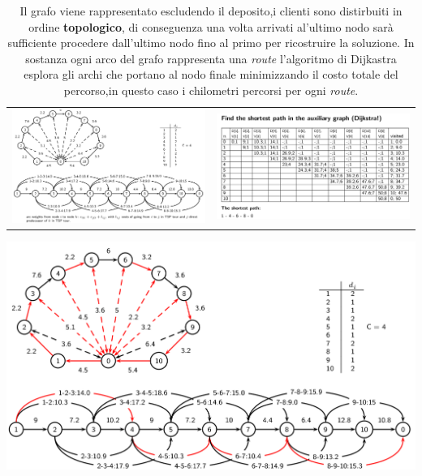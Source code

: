 \documentclass[]{article}
\begin{document}
\begin{table}
	\begin{tabular}{c|c}
		\includegraphics[scale = 0.20]{images/RFSC1.png} & 
		\includegraphics[scale = 0.20]{images/RFSC2.png}  
	
	\end{tabular}
	\begin{centering}
		\includegraphics[scale = 0.20]{images/RFSC3.png}\\	
	\end{centering}

	\caption{Il grafo viene rappresentato escludendo il deposito,i clienti sono distirbuiti in ordine \textbf{topologico}, di conseguenza una volta arrivati al'ultimo nodo sarà sufficiente procedere dall'ultimo nodo fino al primo per ricostruire la soluzione. In sostanza ogni arco del grafo rappresenta una \emph{route} l'algoritmo di Dijkastra esplora gli archi che portano al nodo finale minimizzando il costo totale del percorso,in questo caso i chilometri percorsi per ogni \emph{route}. }
	\label{Table:3}
\end{table}
\end{document}
